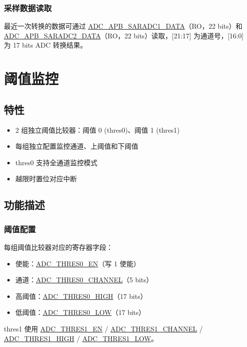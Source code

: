 \documentclass[main\_\_CN.tex]{subfiles}
\begin{document}
\subsubsection{采样数据读取}
最近一次转换的数据可通过 \hyperref[fielddesc:ADCAPBSARADC1DATA]{ADC\_APB\_SARADC1\_DATA}（RO，22 bits）和 \hyperref[fielddesc:ADCAPBSARADC2DATA]{ADC\_APB\_SARADC2\_DATA}（RO，22 bits）读取，[21:17] 为通道号，[16:0] 为 17 bits ADC 转换结果。


\section{阈值监控}
\label{sec:adc-thres}

\subsection{特性}
\begin{itemize}
    \item 2 组独立阈值比较器：阈值 0 (thres0)、阈值 1 (thres1)
    \item 每组独立配置监控通道、上阈值和下阈值
    \item thres0 支持全通道监控模式
    \item 越限时置位对应中断
\end{itemize}

\subsection{功能描述}
\label{sec:adc-thres-func-descr}

\subsubsection{阈值配置}
每组阈值比较器对应的寄存器字段：
\begin{itemize}
    \item 使能：\hyperref[fielddesc:ADCTHRES0EN]{ADC\_THRES0\_EN}（写 1 使能）
    \item 通道：\hyperref[fielddesc:ADCTHRES0CHANNEL]{ADC\_THRES0\_CHANNEL}（5 bits）
    \item 高阈值：\hyperref[fielddesc:ADCTHRES0HIGH]{ADC\_THRES0\_HIGH}（17 bits）
    \item 低阈值：\hyperref[fielddesc:ADCTHRES0LOW]{ADC\_THRES0\_LOW}（17 bits）
\end{itemize}
thres1 使用 \hyperref[fielddesc:ADCTHRES1EN]{ADC\_THRES1\_EN} / \hyperref[fielddesc:ADCTHRES1CHANNEL]{ADC\_THRES1\_CHANNEL} / \hyperref[fielddesc:ADCTHRES1HIGH]{ADC\_THRES1\_HIGH} / \hyperref[fielddesc:ADCTHRES1LOW]{ADC\_THRES1\_LOW}。
\end{document}
